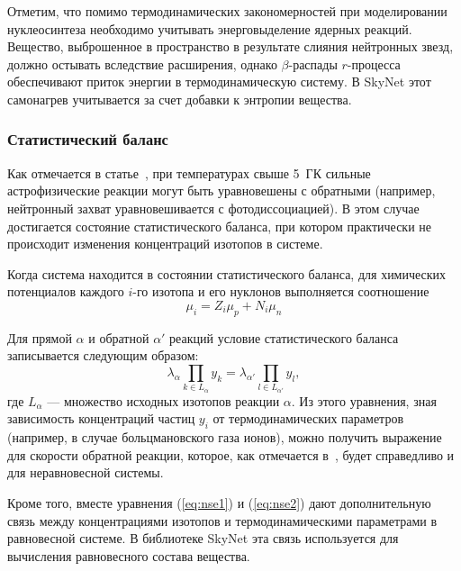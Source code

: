 Отметим, что помимо термодинамических закономерностей при моделировании нуклеосинтеза необходимо учитывать энерговыделение ядерных реакций. Вещество, выброшенное в пространство в результате слияния нейтронных звезд, должно остывать вследствие расширения, однако $\beta$-распады $r$-процесса обеспечивают приток энергии в термодинамическую систему. В SkyNet этот самонагрев учитывается за счет добавки к энтропии вещества.

\subsubsection{Статистический баланс}
\label{sec:nse}
Как отмечается в статье~\cite{lippuner2017}, при температурах свыше 5~ГК сильные астрофизические реакции могут быть уравновешены с обратными (например, нейтронный захват уравновешивается с фотодиссоциацией). В этом случае достигается состояние статистического баланса, при котором практически не происходит изменения концентраций изотопов в системе. 

Когда система находится в состоянии статистического баланса, для химических потенциалов каждого $i$-го изотопа и его нуклонов выполняется соотношение
\begin{equation}
  \mu_i = Z_i \mu_p + N_i \mu_n
  \label{eq:nse1}
\end{equation}

Для прямой $\alpha$ и обратной $\alpha'$ реакций условие статистического баланса записывается следующим образом:
\begin{equation}
\lambda_\alpha \prod_{k \in L_\alpha} y_k = \lambda_{\alpha'} \prod_{l \in L_{\alpha'}} y_l,
\label{eq:nse2}
\end{equation}
где $L_\alpha$ --- множество исходных изотопов реакции $\alpha$. Из этого уравнения, зная зависимость концентраций частиц $y_i$ от термодинамических параметров (например, в случае больцмановского газа ионов), можно получить выражение для скорости обратной реакции, которое, как отмечается в~\cite{lippuner2017}, будет справедливо и для неравновесной системы. 

Кроме того, вместе уравнения (\ref{eq:nse1}) и (\ref{eq:nse2}) дают дополнительную связь между концентрациями изотопов и термодинамическими параметрами в равновесной системе. В библиотеке SkyNet эта связь используется для вычисления равновесного состава вещества.
